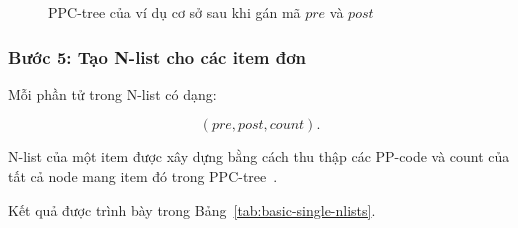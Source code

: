 \begin{figure}[H]
\centering
{}
\caption{PPC-tree của ví dụ cơ sở sau khi gán mã $pre$ và $post$}
\label{fig:basic-ppctree-prepost}
\end{figure}

\subsubsection{Bước 5: Tạo N-list cho các item đơn}

Mỗi phần tử trong N-list có dạng:

\begin{equation}
    (pre,post,count).
\end{equation}

N-list của một item được xây dựng bằng cách thu thập các PP-code và count
của tất cả node mang item đó trong PPC-tree~\cite{deng2012prepost}.

Kết quả được trình bày trong Bảng~\ref{tab:basic-single-nlists}.

